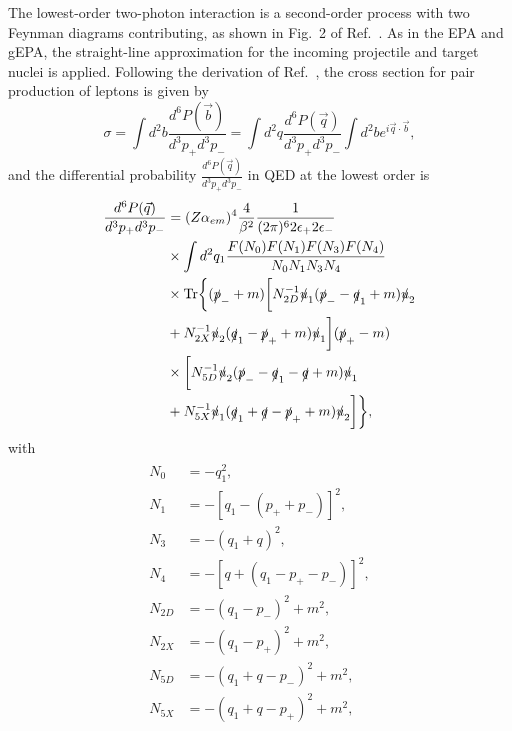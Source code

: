 \documentclass[12pt,epjc3]{svjour3}\sloppy
\begin{document}
The lowest-order two-photon interaction is a second-order process with two Feynman diagrams contributing, as shown in Fig.~2 of Ref.~\cite{PhysRevA.51.1874,PhysRevA.55.396}. As in the EPA and gEPA, the straight-line approximation for the incoming projectile and target nuclei is applied. 
Following the derivation of Ref.~\cite{PhysRevA.51.1874,PhysRevA.55.396}, the cross section for pair production of leptons is given by
\begin{equation}
\label{equation1_new}
    \sigma = \int d^{2}b \frac{d^{6}P(\vec{b})}{d^{3}p_{+}d^{3}p_{-}} = \int d^{2}q \frac{d^{6}P(\vec{q})}{d^{3}p_{+}d^{3}p_{-}} \int d^{2}b e^{i {\vec{q}} \cdot  {\vec{b}}},
\end{equation}
and the differential probability $\frac{d^{6}P(\vec{q})}{d^{3}p_{+}d^{3}p_{-}}$ in QED at the lowest order is 
\begin{align}
    \label{equation2_new}
    \begin{split}
        \frac{d^{6}P(\vec{q})}{d^{3}p_{+}d^{3}p_{-}} & = (Z\alpha_{em})^{4} \frac{4}{\beta^{2}} \frac{1}{(2\pi)^{6}2\epsilon_{+}2\epsilon_{-}} \\ 
        & \times \int d^{2}q_{1} \frac{F(N_{0})F(N_{1})F(N_{3})F(N_{4})}{N_{0}N_{1}N_{3}N_{4}} \\
        & \times {\rm{Tr}}\bigg\{(\slashed{p}_{-}+m)\bigg[N_{2D}^{-1}\slashed{u}_{1} (\slashed{p}_{-} - \slashed{q}_{1} + m)\slashed{u}_{2} \\
        & + N_{2X}^{-1}\slashed{u}_{2}(\slashed{q}_{1} - \slashed{p}_{+} +m)\slashed{u}_{1}\bigg] (\slashed{p}_{+}-m) \\
        & \times \bigg[N_{5D}^{-1}\slashed{u}_{2} (\slashed{p}_{-} - \slashed{q}_{1} - \slashed{q} + m)\slashed{u}_{1} \\ 
        & + N_{5X}^{-1} \slashed{u}_{1} (\slashed{q}_{1} + \slashed{q} - \slashed{p}_{+} + m)\slashed{u}_{2}\bigg] \bigg\},
    \end{split}
\end{align}
with
\begin{align}
    \label{equation3_new}
    \begin{split}
        N_{0} & = -q_{1}^{2},  \\
        N_{1} & = -[q_{1} - (p_{+}+p_{-})]^{2},\\
        N_{3} & = -(q_{1}+q)^{2}, \\
        N_{4} & = -[q+(q_{1} - p_{+} - p_{-})]^{2}, \\
        N_{2D} & = -(q_{1} - p_{-})^{2} + m^{2},\\
        N_{2X} & = -(q_{1} - p_{+})^{2} + m^{2}, \\
        N_{5D} & = -(q_{1} + q - p_{-})^{2} + m^{2},\\
        N_{5X} & = -(q_{1} + q  - p_{+})^{2} + m^{2},
    \end{split}
\end{align}
\end{document}
